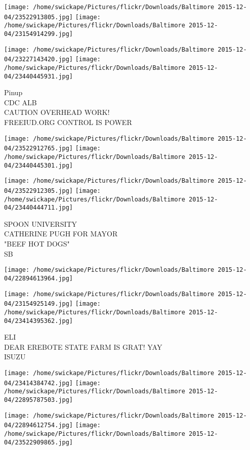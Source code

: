 \documentclass[10pt,letterpaper]{article}
\begin{document}
\texttt{[image: /home/swickape/Pictures/flickr/Downloads/Baltimore 2015-12-04/23522913805.jpg]}
\texttt{[image: /home/swickape/Pictures/flickr/Downloads/Baltimore 2015-12-04/23154914299.jpg]}

\texttt{[image: /home/swickape/Pictures/flickr/Downloads/Baltimore 2015-12-04/23227143420.jpg]}
\texttt{[image: /home/swickape/Pictures/flickr/Downloads/Baltimore 2015-12-04/23440445931.jpg]}

Pinup\\
CDC ALB\\
CAUTION OVERHEAD WORK!\\
FREEIUD.ORG CONTROL IS POWER
\pagebreak

\texttt{[image: /home/swickape/Pictures/flickr/Downloads/Baltimore 2015-12-04/23522912765.jpg]}
\texttt{[image: /home/swickape/Pictures/flickr/Downloads/Baltimore 2015-12-04/23440445301.jpg]}

\texttt{[image: /home/swickape/Pictures/flickr/Downloads/Baltimore 2015-12-04/23522912305.jpg]}
\texttt{[image: /home/swickape/Pictures/flickr/Downloads/Baltimore 2015-12-04/23440444711.jpg]}

SPOON UNIVERSITY\\
CATHERINE PUGH FOR MAYOR\\
"BEEF HOT DOGS"\\
SB
\pagebreak

\texttt{[image: /home/swickape/Pictures/flickr/Downloads/Baltimore 2015-12-04/22894613964.jpg]}

\vspace{0.25in}
\texttt{[image: /home/swickape/Pictures/flickr/Downloads/Baltimore 2015-12-04/23154925149.jpg]}
\texttt{[image: /home/swickape/Pictures/flickr/Downloads/Baltimore 2015-12-04/23414395362.jpg]}

ELI\\
DEAR EREBOTE STATE FARM IS GRAT!  YAY\\
ISUZU
\pagebreak

\texttt{[image: /home/swickape/Pictures/flickr/Downloads/Baltimore 2015-12-04/23414384742.jpg]}
\texttt{[image: /home/swickape/Pictures/flickr/Downloads/Baltimore 2015-12-04/22895787503.jpg]}

\texttt{[image: /home/swickape/Pictures/flickr/Downloads/Baltimore 2015-12-04/22894612754.jpg]}
\texttt{[image: /home/swickape/Pictures/flickr/Downloads/Baltimore 2015-12-04/23522909865.jpg]}
\end{document}
